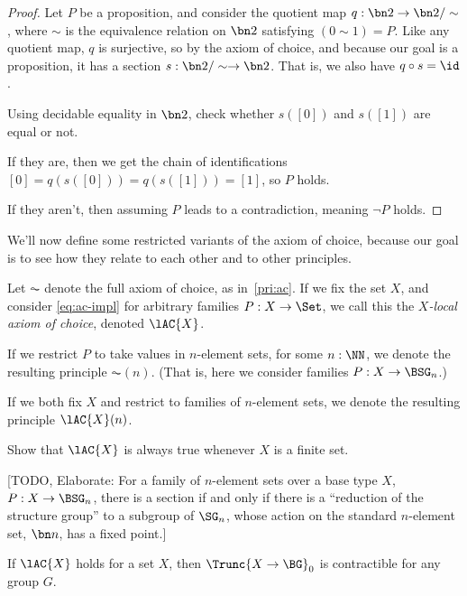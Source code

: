 \begin{proof}
  Let $P$ be a proposition, and consider the quotient map $q : \bn 2 \to \bn 2/\sim$,
  where $\sim$ is the equivalence relation on $\bn 2$ satisfying $(0 \sim 1) = P$.
  Like any quotient map, $q$ is surjective, so by the axiom of choice,
  and because our goal is a proposition,
  it has a section $s : \bn 2/\sim \to \bn 2$.
  That is, we also have $q\circ s = \id$.

  Using decidable equality in $\bn 2$, check whether $s([0])$ and $s([1])$ are equal
  or not.

  If they are, then we get the chain of identifications
  $[0] = q(s([0])) = q(s([1])) = [1]$, so $P$ holds.

  If they aren't, then assuming $P$ leads to a contradiction, meaning $\lnot P$ holds.
\end{proof}

We'll now define some restricted variants of the axiom of choice,
because our goal is to see how they relate to each other and to other principles.

\begin{definition}
  Let $\AC$ denote the full axiom of choice, as in~\cref{pri:ac}.
  If we fix the set $X$, and consider \eqref{eq:ac-impl} for arbitrary families $P:X\to\Set$, we call this the \emph{$X$-local axiom of choice}, denoted $\lAC{X}$.

  If we restrict $P$ to take values in $n$-element sets, for some $n:\NN$,
  we denote the resulting principle $\AC(n)$.
  (That is, here we consider families $P : X \to \BSG_n$.)

  If we both fix $X$ and restrict to families of $n$-element sets,
  we denote the resulting principle $\lAC{X}(n)$.
\end{definition}

\begin{xca}
  Show that $\lAC{X}$ is always true whenever $X$ is a finite set.
\end{xca}

[TODO, Elaborate: For a family of $n$-element sets over a base type $X$, $P : X
  \to \BSG_n$, there is a section if and only if there is a
  ``reduction of the structure group'' to a subgroup of $\SG_n$,
  whose action on the standard $n$-element set, $\bn n$, has a fixed point.]

\begin{lemma}\label{lem:ac-impl-triv-coh-sets}
  If $\lAC{X}$ holds for a set $X$,
  then $\Trunc{X \to \BG}_0$ is contractible for any group $G$.
\end{lemma}

